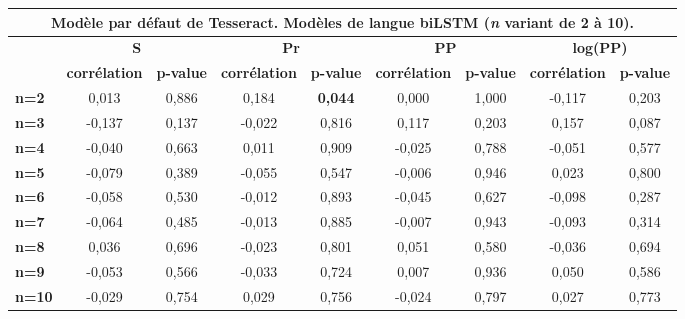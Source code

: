 \documentclass[10pt,twoside]{article}
\begin{document}
\begin{table}
\begin{center}
\begin{scriptsize}
\begin{tabular}{|l|c|c|c|c|c|c|c|c|}
    \end{tabular}
    \begin{tabular}{|l|c|c|c|c|c|c|c|c|}
    \multicolumn{9}{c}{{\footnotesize Modèle par défaut de Tesseract. Modèles de langue biLSTM (\textit{n} variant de 2 à 10).}}\\\hline
    \multirow{2}{*}{\textbf{}} & \multicolumn{2}{c|}{\textbf{S}}         & \multicolumn{2}{c|}{\textbf{Pr}}        & \multicolumn{2}{c|}{\textbf{PP}}        & \multicolumn{2}{c|}{\textbf{log(PP)}}   \\ \cline{2-9} 
                               & \textbf{corrélation} & \textbf{p-value} & \textbf{corrélation} & \textbf{p-value} & \textbf{corrélation} & \textbf{p-value} & \textbf{corrélation} & \textbf{p-value} \\ \hline
    \textbf{n=2}  & 0,013  & 0,886 & 0,184  & \textbf{0,044} & 0,000  & 1,000 & -0,117 & 0,203 \\ \hline
    \textbf{n=3}  & -0,137 & 0,137 & -0,022 & 0,816          & 0,117  & 0,203 & 0,157  & 0,087 \\ \hline
    \textbf{n=4}  & -0,040 & 0,663 & 0,011  & 0,909          & -0,025 & 0,788 & -0,051 & 0,577 \\ \hline
    \textbf{n=5}  & -0,079 & 0,389 & -0,055 & 0,547          & -0,006 & 0,946 & 0,023  & 0,800 \\ \hline
    \textbf{n=6}  & -0,058 & 0,530 & -0,012 & 0,893          & -0,045 & 0,627 & -0,098 & 0,287 \\ \hline
    \textbf{n=7}  & -0,064 & 0,485 & -0,013 & 0,885          & -0,007 & 0,943 & -0,093 & 0,314 \\ \hline
    \textbf{n=8}  & 0,036  & 0,696 & -0,023 & 0,801          & 0,051  & 0,580 & -0,036 & 0,694 \\ \hline
    \textbf{n=9}  & -0,053 & 0,566 & -0,033 & 0,724          & 0,007  & 0,936 & 0,050  & 0,586 \\ \hline
    \textbf{n=10} & -0,029 & 0,754 & 0,029  & 0,756          & -0,024 & 0,797 & 0,027  & 0,773 \\ \hline




\end{tabular}
\end{scriptsize}
\end{center}
\end{table}
\end{document}
